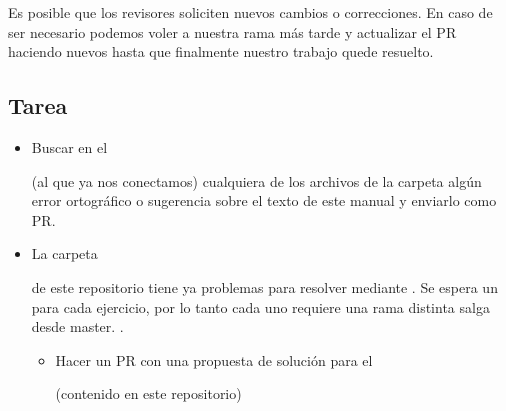 \documentclass[a5paper,9pt,spanish]{sphinxmanual}
\begin{document}
\noindent{}

\sphinxAtStartPar
Es posible que los revisores soliciten nuevos cambios o correcciones.
En caso de ser necesario podemos voler a nuestra rama más tarde y
actualizar el PR haciendo nuevos  hasta que finalmente nuestro
trabajo quede resuelto.


\subsection{Tarea}
\label{\detokenize{mi-primer-pr:tarea}}\begin{itemize}
\item {} 
\sphinxAtStartPar
Buscar en el %
\begin{footnote}[10]\sphinxAtStartFootnote
{}
%
\end{footnote}
(al que ya nos conectamos) cualquiera de los archivos  de la carpeta  algún error
ortográfico o sugerencia sobre el texto de este manual y enviarlo como PR.

\item {} 
\sphinxAtStartPar
La carpeta %
\begin{footnote}[11]\sphinxAtStartFootnote
{}
%
\end{footnote}
de este repositorio tiene ya problemas para resolver mediante .
Se espera un  para cada ejercicio, por lo tanto cada uno requiere una
rama distinta  salga desde master.
.
\begin{itemize}
\item {} 
\sphinxAtStartPar
Hacer un PR con una propuesta de solución para el
%
\begin{footnote}[12]\sphinxAtStartFootnote
{}
%
\end{footnote}
(contenido en este repositorio)


\end{itemize}
\end{itemize}
\end{document}
